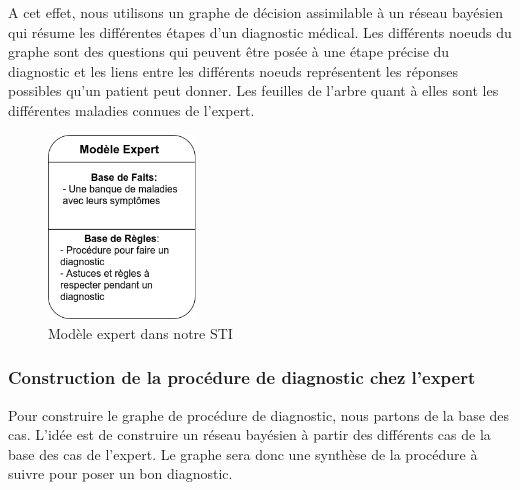     A cet effet, nous utilisons un graphe de décision assimilable à un réseau bayésien qui résume les différentes étapes d'un diagnostic médical.
    Les différents noeuds du graphe sont des questions qui peuvent être posée à une étape précise du diagnostic et les liens entre les différents noeuds représentent les réponses possibles qu'un patient peut donner. Les feuilles de l'arbre quant à elles sont les différentes maladies connues de l'expert.
    
    \begin{figure}[H]
        \includegraphics[width=0.35\textwidth]{figures/concept_expert.png}
        \captionsetup{justification=centering}
        \caption{Modèle expert dans notre STI}
        \label{fig:3}
    \end{figure}
    
    \subsubsection{Construction de la procédure de diagnostic chez l'expert}
    Pour construire le graphe de procédure de diagnostic, nous partons de la base des cas. L'idée est de construire un réseau bayésien à partir des différents cas de la base des cas de l'expert.
    Le graphe sera donc une synthèse de la procédure à suivre pour poser un bon diagnostic.
    
